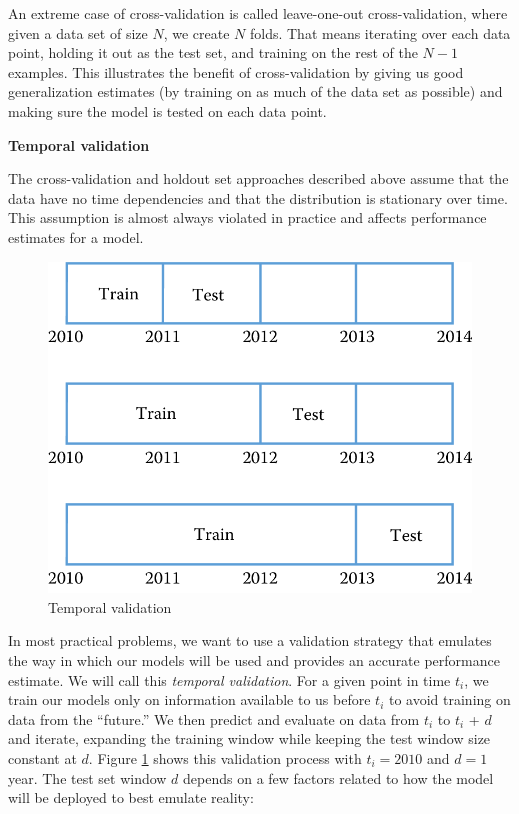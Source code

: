 \documentclass[]{krantz}
\begin{document}
An extreme case of cross-validation is called leave-one-out
cross-validation, where given a data set of size \(N\), we create \(N\)
folds. That means iterating over each data point, holding it out as the
test set, and training on the rest of the \(N-1\) examples. This
illustrates the benefit of cross-validation by giving us good
generalization estimates (by training on as much of the data set as
possible) and making sure the model is tested on each data point.

\textbf{Temporal validation}

The cross-validation and holdout set approaches described above assume
that the data have no time dependencies and that the distribution is
stationary over time. This assumption is almost always violated in
practice and affects performance estimates for a model.

\begin{figure}

{\centering \includegraphics[width=0.7\linewidth]{ChapterML/figures/temporal} 

}

\caption{Temporal validation}\label{fig:temporal}
\end{figure}

In most practical problems, we want to use a validation strategy that
emulates the way in which our models will be used and provides an
accurate performance estimate. We will call this \emph{temporal
validation}. For a given point in time \(t_i\), we train our models only
on information available to us before \(t_i\) to avoid training on data
from the ``future.'' We then predict and evaluate on data from \(t_i\)
to \(t_i\) + \(d\) and iterate, expanding the training window while
keeping the test window size constant at \(d\). Figure
\ref{fig:temporal} shows this validation process with \(t_i=2010\) and
\(d=1\) year. The test set window \(d\) depends on a few factors related
to how the model will be deployed to best emulate reality:
\end{document}

